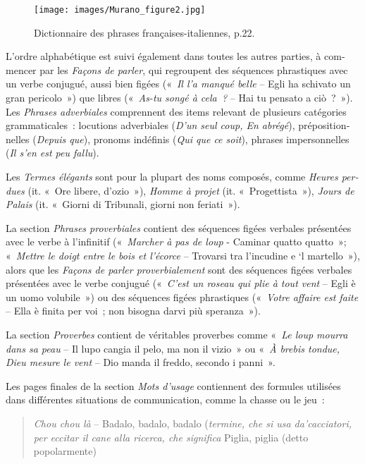 \documentclass[output=paper,booklanguage=french]{langscibook}
\begin{document}
\begin{otherlanguage}{french}
\begin{figure}
\texttt{[image: images/Murano\_figure2.jpg]}
\caption{Dictionnaire des phrases françaises-italiennes, p.22.}
\label{fig:murano:Figure 2}
\end{figure}

L’ordre alphabétique est suivi également dans toutes les autres parties, à commencer par les \emph{Façons de parler}, qui regroupent des séquences phrastiques avec un verbe conjugué, aussi bien figées («~\emph{Il l’a manqué belle} – Egli ha schivato un gran pericolo~») que libres («~\emph{As-tu songé à cela~?} – Hai tu pensato a ciò~?~»). Les \emph{Phrases adverbiales} comprennent des items relevant de plusieurs catégories grammaticales~: locutions adverbiales (\emph{D’un seul coup, En abrégé}), prépositionnelles (\emph{Depuis que}), pronoms indéfinis (\emph{Qui que ce soit}), phrases impersonnelles (\emph{Il s’en est peu fallu}).

Les \emph{Termes élégants} sont pour la plupart des noms composés, comme \emph{Heures perdues} (it. «~Ore libere, d’ozio~»), \emph{Homme à projet} (it. «~Progettista~»), \emph{Jours de Palais} (it. «~Giorni di Tribunali, giorni non feriati~»).

La section \emph{Phrases proverbiales} contient des séquences figées verbales présentées avec le verbe à l’infinitif («~\emph{Marcher à pas de loup} - Caminar quatto quatto~»; «~\emph{Mettre le doigt entre le bois et l’écorce} – Trovarsi tra l’incudine e ‘l martello~»), alors que les \emph{Façons de parler proverbialement} sont des séquences figées verbales présentées avec le verbe conjugué («~\emph{C’est un roseau qui plie à tout vent} – Egli è un uomo volubile~») ou des séquences figées phrastiques («~\emph{Votre affaire est faite} – Ella è finita per voi~; non bisogna darvi più speranza~»). 

La section \emph{Proverbes} contient de véritables proverbes comme «~\emph{Le loup mourra dans sa peau} – Il lupo cangia il pelo, ma non il vizio~» ou «~\emph{À brebis tondue, Dieu mesure le vent} – Dio manda il freddo, secondo i panni~». 

Les pages finales de la section \emph{Mots d’usage} contiennent des formules utilisées dans différentes situations de communication, comme la chasse ou le jeu~:

\begin{quote}
    \emph{Chou chou là} – Badalo, badalo, badalo (\emph{termine, che si usa da’cacciatori, per eccitar il cane alla ricerca, che significa} Piglia, piglia (detto popolarmente)


\end{quote}
\end{otherlanguage}
\end{document}
